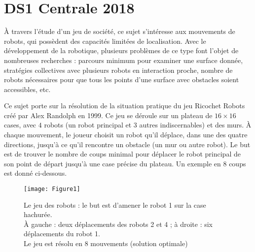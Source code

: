 
\chapter{DS1 Centrale 2018}

À travers l'étude d'un jeu de société, ce sujet s'intéresse aux
mouvements de robots, qui possèdent des capacités
limitées de localisation. Avec le développement de la robotique,
plusieurs problèmes de ce type font l'objet de nombreuses
recherches :
parcours minimum pour examiner une surface donnée, stratégies
collectives avec plusieurs robots en interaction proche, nombre de
robots nécessaires pour que tous les points d'une surface avec obstacles
soient accessibles, etc.

Ce sujet porte sur la résolution de la situation pratique du jeu
{\sc Ricochet Robots} créé par Alex Randolph en 1999. Ce jeu se déroule
sur un plateau de $16 \times 16$ cases, avec $4$ robots (un robot principal et 3 autres indiscernables) et des murs. À
chaque mouvement, le joueur choisit un robot qu'il déplace, dans une des quatre
directions, jusqu'à ce qu'il rencontre un obstacle (un mur ou autre
robot). Le but est de trouver le nombre de coups minimal pour déplacer
le robot principal de son point de départ jusqu'à une case précise du
plateau. Un exemple en 8 coups est donné ci-dessous.
\begin{figure}[ht]
\begin{center}
\texttt{[image: Figure1]}
\caption{Le jeu des robots : le but est d'amener le robot 1 sur la case hachurée.\\
À gauche : deux déplacements des robots 2 et 4 ;
à droite : six déplacements du robot 1.\\
Le jeu est résolu en 8 mouvements (solution optimale)}
\end{center}
\end{figure}
\newpage

